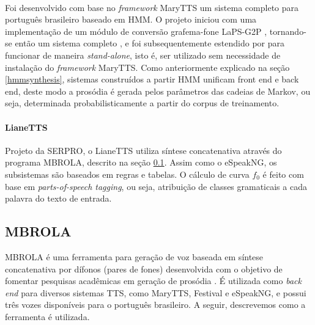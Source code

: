 
\paragraph{\cite{couto}}
Foi desenvolvido com base no \emph{framework} MaryTTS um sistema completo para
português brasileiro baseado em HMM. O projeto iniciou com uma implementação
de um módulo de conversão grafema-fone LaPS-G2P \cite{g2pusp}, tornando-se então
um sistema completo \cite{couto}, e foi subsequentemente estendido por
 para funcionar de maneira \emph{stand-alone}, isto é, ser
utilizado sem necessidade de instalação do \emph{framework} MaryTTS. Como
anteriormente explicado na seção \ref{hmmsynthesis}, sistemas construídos a
partir HMM unificam front end e back end, deste modo a prosódia
é gerada pelos parâmetros das cadeias de Markov, ou seja, determinada
probabilisticamente a partir do corpus de treinamento.


\paragraph{LianeTTS \cite{lianetts}}
Projeto da SERPRO, o LianeTTS utiliza síntese concatenativa através do programa
MBROLA, descrito na seção \ref{sec:mbrola}. Assim como o eSpeakNG, os
subsistemas são baseados em regras e tabelas. O cálculo de curva $ f_0 $ é feito com
base em \emph{parts-of-speech tagging}, ou seja, atribuição de classes
gramaticais a cada palavra do texto de entrada.

\subsection{MBROLA}
\label{sec:mbrola}
MBROLA é uma ferramenta para geração de voz baseada em síntese concatenativa por
dífonos (pares de fones) desenvolvida com o objetivo de fomentar pesquisas
acadêmicas em geração de prosódia \cite{mbrola}. É utilizada como
\emph{back end} para diversos sistemas TTS, como MaryTTS, Festival
\cite{festival} e eSpeakNG, e possui três vozes disponíveis para o português
brasileiro. A seguir, descrevemos como a ferramenta é utilizada. %

